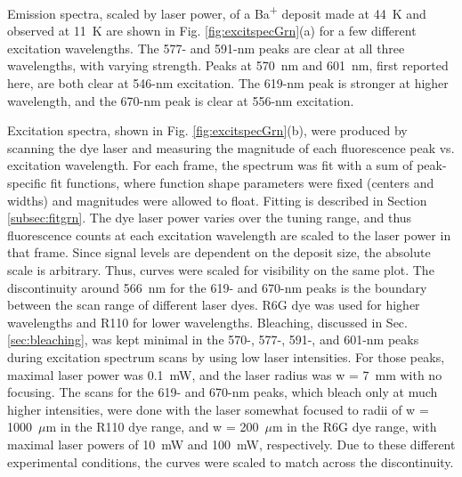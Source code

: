 



Emission spectra, scaled by laser power, of a Ba\textsuperscript{+} deposit made at 44~K and observed at 11~K are shown in Fig. \ref{fig:excitspecGrn}(a) for a few different excitation wavelengths.  The 577- and 591-nm peaks are clear at all three wavelengths, with varying strength.  Peaks at 570~nm and 601~nm, first reported here, are both clear at 546-nm excitation.  The 619-nm peak is stronger at higher wavelength, and the 670-nm peak is clear at 556-nm excitation.

Excitation spectra, shown in Fig. \ref{fig:excitspecGrn}(b), were produced by scanning the dye laser and measuring the magnitude of each fluorescence peak vs. excitation wavelength.  For each frame, the spectrum was fit with a sum of peak-specific fit functions, where function shape parameters were fixed (centers and widths) and magnitudes were allowed to float.  Fitting is described in Section \ref{subsec:fitgrn}.  The dye laser power varies over the tuning range, and thus fluorescence counts at each excitation wavelength are scaled to the laser power in that frame.  Since signal levels are dependent on the deposit size, the absolute scale is arbitrary.  Thus, curves were scaled for visibility on the same plot.  The discontinuity around 566~nm for the 619- and 670-nm peaks is the boundary between the scan range of different laser dyes.  R6G dye was used for higher wavelengths and R110 for lower wavelengths.  Bleaching, discussed in Sec. \ref{sec:bleaching}, was kept minimal in the 570-, 577-, 591-, and 601-nm peaks during excitation spectrum scans by using low laser intensities.  For those peaks, maximal laser power was 0.1~mW, and the laser radius was w = 7~mm with no focusing.  The scans for the 619- and 670-nm peaks, which bleach only at much higher intensities, were done with the laser somewhat focused to radii of w = 1000~$\mu$m in the R110 dye range, and w = 200~$\mu$m in the R6G dye range, with maximal laser powers of 10~mW and 100~mW, respectively.  Due to these different experimental conditions, the curves were scaled to match across the discontinuity.

